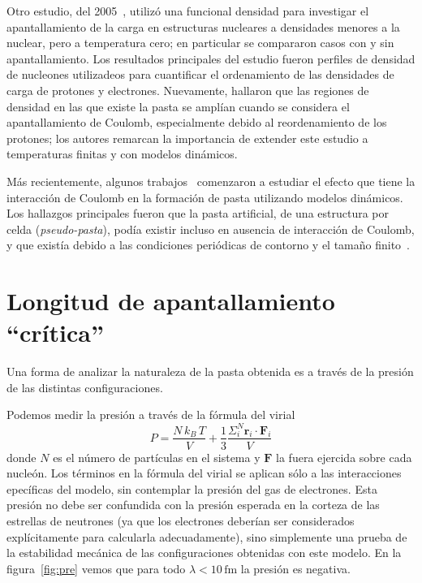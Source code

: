 Otro estudio, del 2005~\cite{maruyama_nuclear_2005}, utilizó una funcional densidad para investigar el apantallamiento de la carga en estructuras nucleares a densidades menores a la nuclear, pero a temperatura cero; en particular se compararon casos con y sin apantallamiento.
Los resultados principales del estudio fueron perfiles de densidad de nucleones utilizadeos para cuantificar el ordenamiento de las densidades de carga de protones y electrones.
Nuevamente, hallaron que las regiones de densidad en las que existe la pasta se amplían cuando se considera el apantallamiento de Coulomb, especialmente debido al reordenamiento de los protones; los autores remarcan la importancia de extender este estudio a temperaturas finitas y con modelos dinámicos.

Más recientemente, algunos trabajos~\cite{schneider_nuclear_2013,gimenez_molinelli_simulations_2014} comenzaron a estudiar el efecto que tiene la interacción de Coulomb en la formación de pasta utilizando modelos dinámicos.
Los hallazgos principales fueron que la pasta artificial, de una estructura por celda (\emph{pseudo-pasta}), podía existir incluso en ausencia de interacción de Coulomb, y que existía debido a las condiciones periódicas de contorno y el tamaño finito~\cite{binder_beyond_2012}.

\section{Longitud de apantallamiento ``crítica''}\label{lambda_c}

Una forma de analizar la naturaleza de la pasta obtenida es a través de la presión de las distintas configuraciones.

Podemos medir la presión a través de la fórmula del virial
\begin{equation*}
P=\frac{N\,k_B\,T}{V} + \frac{1}{3}
\frac{\Sigma_{i}^{N}\mathbf{r}_i\cdot\mathbf{F}_i}{V}
\end{equation*}
donde $N$ es el número de partículas en el sistema y $\mathbf{F}$ la fuera ejercida sobre cada nucleón.
Los términos en la fórmula del virial se aplican sólo a las interacciones epecíficas del modelo, sin contemplar la presión del gas de electrones.
Esta presión no debe ser confundida con la presión esperada en la corteza de las estrellas de neutrones (ya que los electrones deberían ser considerados explícitamente para calcularla adecuadamente), sino simplemente una prueba de la estabilidad mecánica de las configuraciones obtenidas con este modelo.
En la figura~\ref{fig:pre} vemos que para todo $\lambda<10\,\text{fm}$ la presión es negativa.


